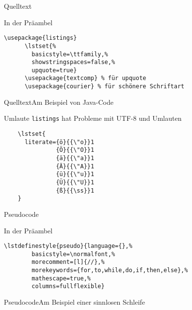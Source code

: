 \begin{Frame}[fragile]{Quelltext}
  \begin{Block}{In der Präambel}
    \begin{lstlisting}[style=block,gobble=6]
      \usepackage{listings}
      \lstset{%
        basicstyle=\ttfamily,%
        showstringspaces=false,%
        upquote=true}
      \usepackage{textcomp} % für upquote
      \usepackage{courier} % für schönere Schriftart
    \end{lstlisting}
  \end{Block}
\end{Frame}

\begin{Frame}{Quelltext}{Am Beispiel von Java-Code}
  

  \xxx

  
\end{Frame}

\begin{Frame}[fragile]{Umlaute}
  \texttt{listings} hat Probleme mit UTF-8 und Umlauten
  \begin{lstlisting}[gobble=4]
    % german umlauts
    \lstset{
      literate={ö}{{\"o}}1
               {Ö}{{\"O}}1
               {ä}{{\"a}}1
               {Ä}{{\"A}}1
               {ü}{{\"u}}1
               {Ü}{{\"U}}1
               {ß}{{\ss}}1
    }
  \end{lstlisting}
\end{Frame}

\begin{Frame}[fragile]{Pseudocode}
  \begin{Block}{In der Präambel}
    \begin{lstlisting}[style=block,gobble=6]
      \lstdefinestyle{pseudo}{language={},%
        basicstyle=\normalfont,%
        morecomment=[l]{//},%
        morekeywords={for,to,while,do,if,then,else},%
        mathescape=true,%
        columns=fullflexible}
    \end{lstlisting}
  \end{Block}
\end{Frame}

\begin{Frame}{Pseudocode}{Am Beispiel einer sinnlosen Schleife}
  

  \xxx

  
\end{Frame}

